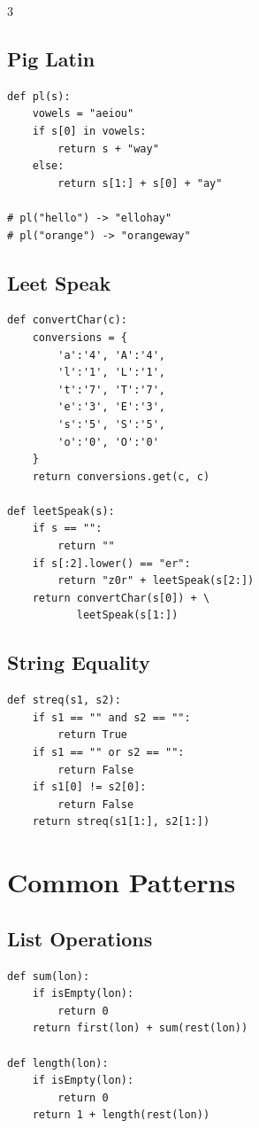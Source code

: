 \documentclass[8pt,landscape,a4paper]{article}
\begin{document}
\begin{multicols}{3}
\subsection*{Pig Latin}
\begin{lstlisting}
def pl(s):
    vowels = "aeiou"
    if s[0] in vowels:
        return s + "way"
    else:
        return s[1:] + s[0] + "ay"

# pl("hello") -> "ellohay"
# pl("orange") -> "orangeway"
\end{lstlisting}

\columnbreak

\subsection*{Leet Speak}
\begin{lstlisting}
def convertChar(c):
    conversions = {
        'a':'4', 'A':'4',
        'l':'1', 'L':'1',
        't':'7', 'T':'7',
        'e':'3', 'E':'3',
        's':'5', 'S':'5',
        'o':'0', 'O':'0'
    }
    return conversions.get(c, c)

def leetSpeak(s):
    if s == "":
        return ""
    if s[:2].lower() == "er":
        return "z0r" + leetSpeak(s[2:])
    return convertChar(s[0]) + \
           leetSpeak(s[1:])
\end{lstlisting}

\subsection*{String Equality}
\begin{lstlisting}
def streq(s1, s2):
    if s1 == "" and s2 == "":
        return True
    if s1 == "" or s2 == "":
        return False
    if s1[0] != s2[0]:
        return False
    return streq(s1[1:], s2[1:])
\end{lstlisting}

\section*{Common Patterns}

\subsection*{List Operations}
\begin{lstlisting}
def sum(lon):
    if isEmpty(lon):
        return 0
    return first(lon) + sum(rest(lon))

def length(lon):
    if isEmpty(lon):
        return 0
    return 1 + length(rest(lon))


\end{lstlisting}
\end{multicols}
\end{document}
